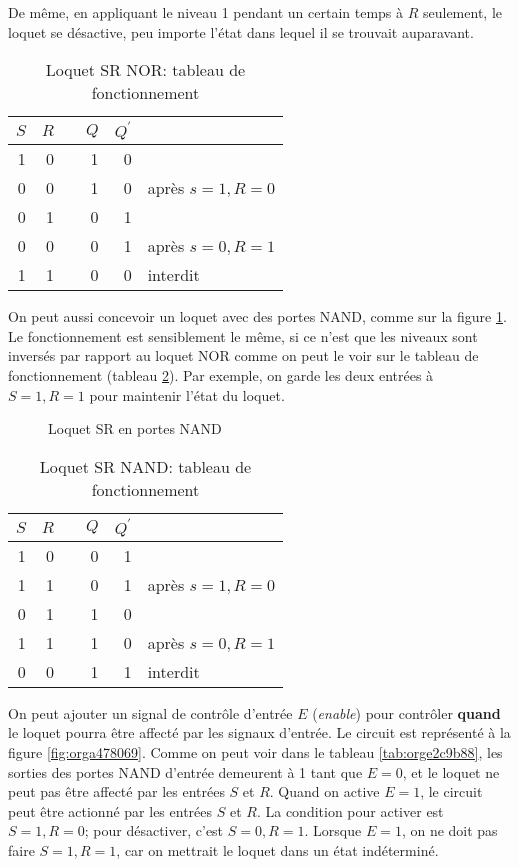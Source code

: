 \documentclass[letter, oneside]{book}
\begin{document}
\begin{enumerate}
De même, en appliquant le niveau 1 pendant un certain
temps à \(R\) seulement, le loquet se désactive, peu importe l'état
dans lequel il se trouvait auparavant.

\begin{table}[htbp]
\caption{\label{tab:org4df7e6f}Loquet SR NOR: tableau de fonctionnement}
\centering
\begin{tabular}{rrlrrl}
\(S\) & \(R\) &  & \(Q\) & \(Q^\prime\) & \\[0pt]
\hline
1 & 0 &  & 1 & 0 & \\[0pt]
0 & 0 &  & 1 & 0 & après \(s=1, R=0\)\\[0pt]
0 & 1 &  & 0 & 1 & \\[0pt]
0 & 0 &  & 0 & 1 & après \(s=0, R=1\)\\[0pt]
1 & 1 &  & 0 & 0 & interdit\\[0pt]
\end{tabular}
\end{table}

On peut aussi concevoir un loquet avec des portes NAND, comme sur la
figure \ref{fig:org1a0828b}. Le fonctionnement est sensiblement le même,
si ce n'est que les niveaux sont inversés par rapport au loquet NOR
comme on peut le voir sur le tableau de fonctionnement (tableau
\ref{tab:org71b038a}). Par exemple, on garde les deux entrées à \(S=1, R=1\)
pour maintenir l'état du loquet.

\begin{figure}[htbp]
\centering

\caption{\label{fig:org1a0828b}Loquet SR en portes NAND}
\end{figure}

\begin{table}[htbp]
\caption{\label{tab:org71b038a}Loquet SR NAND: tableau de fonctionnement}
\centering
\begin{tabular}{rrlrrl}
\(S\) & \(R\) &  & \(Q\) & \(Q^\prime\) & \\[0pt]
\hline
1 & 0 &  & 0 & 1 & \\[0pt]
1 & 1 &  & 0 & 1 & après \(s=1, R=0\)\\[0pt]
0 & 1 &  & 1 & 0 & \\[0pt]
1 & 1 &  & 1 & 0 & après \(s=0, R=1\)\\[0pt]
0 & 0 &  & 1 & 1 & interdit\\[0pt]
\end{tabular}
\end{table}

On peut ajouter un signal de contrôle d'entrée \(E\) (\emph{enable}) pour
contrôler \textbf{quand} le loquet pourra être affecté par les signaux
d'entrée. Le circuit est représenté à la figure \ref{fig:orga478069}. Comme
on peut voir dans le tableau \ref{tab:orge2c9b88}, les sorties des portes
NAND d'entrée demeurent à 1 tant que \(E = 0\), et le loquet ne peut
pas être affecté par les entrées \(S\) et \(R\). Quand on active \(E
= 1\), le circuit peut être actionné par les entrées \(S\) et \(R\). La condition pour activer est \(S=1, R=0\); pour désactiver,
c'est \(S=0, R=1\). Lorsque \(E = 1\), on ne doit pas faire \(S=1,
R=1\), car on mettrait le loquet dans un état indéterminé.


\end{enumerate}
\end{document}
